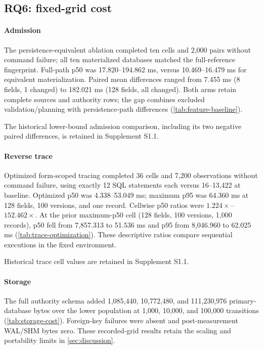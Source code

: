 \subsection{RQ6: fixed-grid cost}

\paragraph{Admission}
The persistence-equivalent ablation completed ten cells and 2,000 pairs without command failure; all ten materialized databases matched the full-reference fingerprint. Full-path p50 was 17.820--194.862 ms, versus 10.469--16.479 ms for equivalent materialization. Paired mean differences ranged from 7.455 ms (8 fields, 1 changed) to 182.021 ms (128 fields, all changed). Both arms retain complete sources and authority rows; the gap combines excluded validation/planning with persistence-path differences (\cref{tab:feature-baseline}).



The historical lower-bound admission comparison, including its two negative paired differences, is retained in Supplement S1.1.

\paragraph{Reverse trace}
Optimized form-scoped tracing completed 36 cells and 7,200 observations without command failure, using exactly 12 SQL statements each versus 16--13,422 at baseline. Optimized p50 was 4.338--53.049 ms; maximum p95 was 64.360 ms at 128 fields, 100 versions, and one record. Cellwise p50 ratios were $1.224\times$--$152.462\times$. At the prior maximum-p50 cell (128 fields, 100 versions, 1,000 records), p50 fell from 7,857.313 to 51.536 ms and p95 from 8,046.960 to 62.025 ms (\cref{tab:trace-optimization}). These descriptive ratios compare sequential executions in the fixed environment.



Historical trace cell values are retained in Supplement S1.1.

\paragraph{Storage}
The full authority schema added 1,085,440, 10,772,480, and 111,230,976 primary-database bytes over the lower population at 1,000, 10,000, and 100,000 transitions (\cref{tab:storage-cost}). Foreign-key failures were absent and post-measurement WAL/SHM bytes zero. These recorded-grid results retain the scaling and portability limits in \cref{sec:discussion}.

